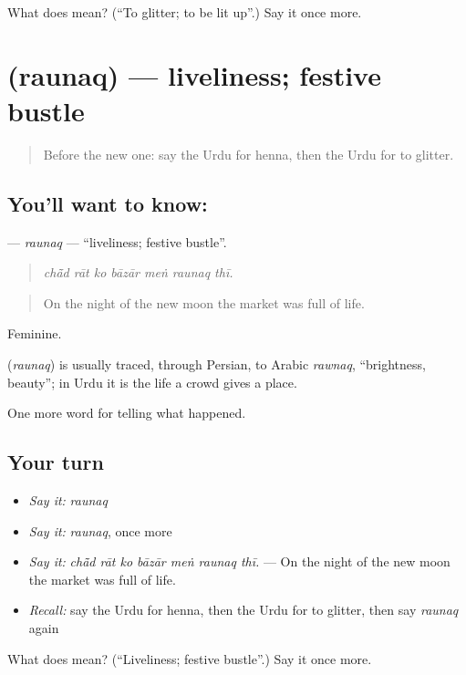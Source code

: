 \begin{tcolorbox}[breakable,colback=teal!4,colframe=teal!35!black,title={Before you move on}]
What does  mean? (\textquotedblleft{}To glitter; to be lit up\textquotedblright{}.) Say it once more.
\end{tcolorbox}
\section[\texorpdfstring{\ur{رونق} (raunaq)}{رونق (raunaq)}]{ (raunaq) — liveliness; festive bustle}

\label{lesson:UR-C317-raunaq}



\begin{quote}
Before the new one: say the Urdu for henna, then the Urdu for to glitter.
\end{quote}

\subsection*{You'll want to know: }
\textbf{} — \emph{raunaq} — \textquotedblleft{}liveliness; festive bustle\textquotedblright{}.

\begin{quote}
      
\end{quote}

\begin{quote}
\emph{chā̃d rāt ko bāzār meṅ raunaq thī.}
\end{quote}

\begin{quote}
On the night of the new moon the market was full of life.
\end{quote}

Feminine.

\begin{cousinweb}
\textbf{} (\emph{raunaq}) is usually traced, through Persian, to Arabic \emph{rawnaq}, \textquotedblleft{}brightness, beauty\textquotedblright{}; in Urdu it is the life a crowd gives a place.
\end{cousinweb}

\begin{grammarlens}[title={What you've built}]
One more word for telling what happened.
\end{grammarlens}

\subsection*{Your turn}
\begin{itemize}
\raggedright
  \item \emph{Say it:} \emph{raunaq}
  \item \emph{Say it:} \emph{raunaq}, once more
  \item \emph{Say it:} \emph{chā̃d rāt ko bāzār meṅ raunaq thī.} — On the night of the new moon the market was full of life.
  \item \emph{Recall:} say the Urdu for henna, then the Urdu for to glitter, then say \emph{raunaq} again
\end{itemize}

\begin{tcolorbox}[breakable,colback=teal!4,colframe=teal!35!black,title={Before you move on}]
What does  mean? (\textquotedblleft{}Liveliness; festive bustle\textquotedblright{}.) Say it once more.
\end{tcolorbox}
